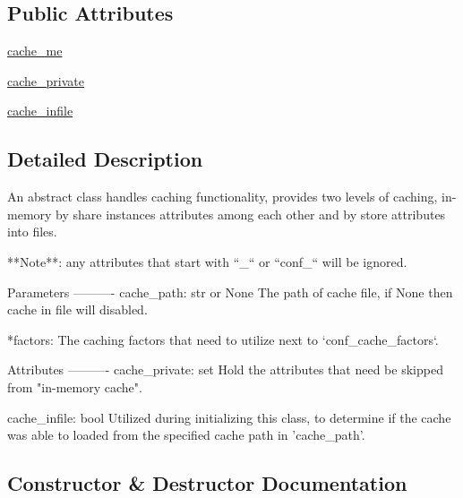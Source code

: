 \subsection*{Public Attributes}
\begin{DoxyCompactItemize}
\item 
\hyperlink{classnumpy_1_1distutils_1_1ccompiler__opt_1_1__Cache_a41e4ca9c0f53576357f0aaa61e08424f}{cache\+\_\+me}
\item 
\hyperlink{classnumpy_1_1distutils_1_1ccompiler__opt_1_1__Cache_aac9cb2c527dd20401ca30c7bd03289b6}{cache\+\_\+private}
\item 
\hyperlink{classnumpy_1_1distutils_1_1ccompiler__opt_1_1__Cache_a91fdcfe0496fafbbd939a0f02ecb6289}{cache\+\_\+infile}
\end{DoxyCompactItemize}


\subsection{Detailed Description}
\begin{DoxyVerb}An abstract class handles caching functionality, provides two
levels of caching, in-memory by share instances attributes among
each other and by store attributes into files.

**Note**:
    any attributes that start with ``_`` or ``conf_`` will be ignored.

Parameters
----------
cache_path: str or None
    The path of cache file, if None then cache in file will disabled.

*factors:
    The caching factors that need to utilize next to `conf_cache_factors`.

Attributes
----------
cache_private: set
    Hold the attributes that need be skipped from "in-memory cache".

cache_infile: bool
    Utilized during initializing this class, to determine if the cache was able
    to loaded from the specified cache path in 'cache_path'.
\end{DoxyVerb}
 

\subsection{Constructor \& Destructor Documentation}
\mbox{\label{classnumpy_1_1distutils_1_1ccompiler__opt_1_1__Cache_afb3386dbb8eeb48ff979dd3e63be2d94}} 
